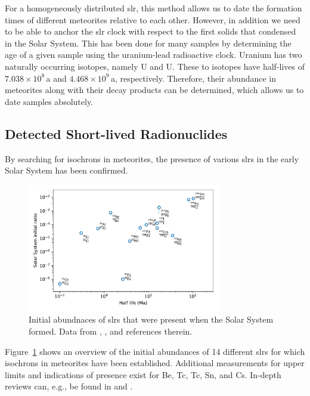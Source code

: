 For a homogeneously distributed \ac{slr}, this method allows us to date the formation times of different meteorites relative to each other. However, in addition we need to be able to anchor the \ac{slr} clock with respect to the first solids that condensed in the Solar System. This has been done for many samples by determining the age of a given sample using the uranium-lead radioactive clock. Uranium has two naturally occurring isotopes, namely U and U. These to isotopes have half-lives of $7.038\times10^{8}$\,a and $4.468\times10^{9}$\,a, respectively. Therefore, their abundance in meteorites along with their decay products can be determined, which allows us to date samples absolutely.




\subsection{Detected Short-lived Radionuclides}

By searching for isochrons in meteorites, the presence of various \acp{slr} in the early Solar System has been confirmed. 
\begin{figure}[tb]
    \centering
    \includegraphics[width=0.75\textwidth]{graphics/solar_system_slrs/slr_initial_abundances}
    \caption{Initial abundnaces of \acp{slr} that were present when the Solar System formed. Data from \citet{dauphas11}, \citet{lugaro18rad}, and references therein.}
    \label{fig:solar_system_slrs:slr_initial_abundances}
\end{figure}
Figure~\ref{fig:solar_system_slrs:slr_initial_abundances} shows an overview of the initial abundances of 14 different \acp{slr} for which isochrons in meteorites have been established. Additional measurements for upper limits and indications of presence exist for Be, Tc, Tc, Sn, and Cs. In-depth reviews can, e.g., be found in \citet{dauphas11} and \citet{lugaro18rad}.

